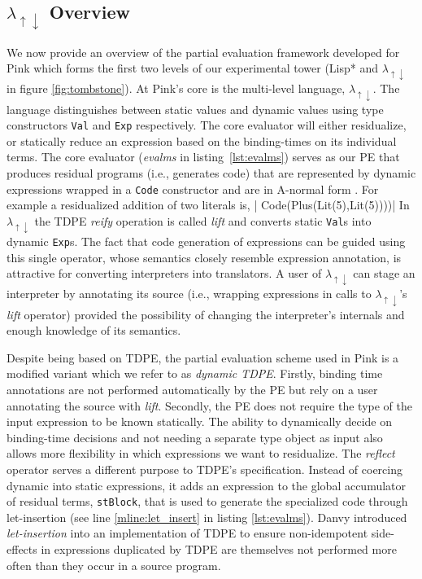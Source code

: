 \documentclass[a4paper,12pt,twoside,openright]{report}
\theoremstyle{definition}
\newcommand{\mslang}{$\lambda_{\uparrow\downarrow}$}
\begin{document}
\subsection{\texorpdfstring{\mslang}{Lg} Overview}\label{subsec:mslang}
We now provide an overview of the partial evaluation framework developed for Pink \cite{amin2017collapsing} which forms the first two levels of our experimental tower (Lisp* and \mslang{} in figure \ref{fig:tombstone}). At Pink's core is the multi-level language, \mslang{}. The language distinguishes between static values and dynamic values using type constructors \texttt{Val} and \texttt{Exp} respectively. The core evaluator will either residualize, or statically reduce an expression based on the binding-times on its individual terms. The core evaluator (\textit{evalms} in listing~\ref{lst:evalms}) serves as our PE that produces residual programs (i.e., generates code) that are represented by dynamic expressions wrapped in a \texttt{Code} constructor and are in A-normal form \cite{flanagan1993essence}. For example a residualized addition of two literals is,
|    Code(Plus(Lit(5),Lit(5))))|
In \mslang{} the TDPE \textit{reify} operation is called \textit{lift} and converts static \texttt{Val}s into dynamic \texttt{Exp}s. The fact that code generation of expressions can be guided using this single operator, whose semantics closely resemble expression annotation, is attractive for converting interpreters into translators. A user of \mslang{} can stage an interpreter by annotating its source (i.e., wrapping expressions in calls to \mslang{}'s \textit{lift} operator) provided the possibility of changing the interpreter's internals and enough knowledge of its semantics.

Despite being based on TDPE, the partial evaluation scheme used in Pink is a modified variant which we refer to as \textit{dynamic TDPE}. Firstly, binding time annotations are not performed automatically by the PE but rely on a user annotating the source with \textit{lift}. Secondly, the PE does not require the type of the input expression to be known statically. The ability to dynamically decide on binding-time decisions and not needing a separate type object as input also allows more flexibility in which expressions we want to residualize. The \textit{reflect} operator serves a different purpose to TDPE's specification. Instead of coercing dynamic into static expressions, it adds an expression to the global accumulator of residual terms, \texttt{stBlock}, that is used to generate the specialized code through let-insertion (see line \ref{mline:let_insert} in listing \ref{lst:evalms}). Danvy introduced \textit{let-insertion} into an implementation of TDPE \cite{hatcliff2007partial} to ensure non-idempotent side-effects in expressions duplicated by TDPE are themselves not performed more often than they occur in a source program.
\end{document}
